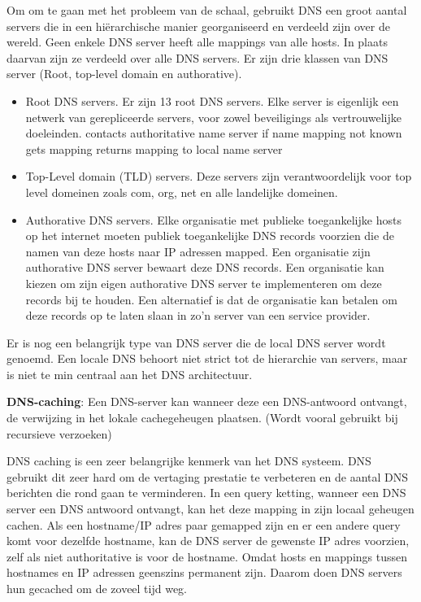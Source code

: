 
Om om te gaan met het probleem van de schaal, gebruikt DNS een groot aantal servers die in een hiërarchische manier georganiseerd en verdeeld zijn over de wereld. Geen enkele DNS server heeft alle mappings van alle hosts. In plaats daarvan zijn ze verdeeld over alle DNS servers. Er zijn drie klassen van DNS server (Root, top-level domain en authorative).

\begin{itemize}
    \item Root DNS servers. Er zijn 13 root DNS servers. Elke server is eigenlijk een netwerk van gerepliceerde servers, voor zowel beveiligings als vertrouwelijke doeleinden.
    \bi
    \itf contacts authoritative name server if name mapping not known
    \itf gets mapping
    \itf returns mapping to local name server
    \ei
\item Top-Level domain (TLD) servers. Deze servers zijn verantwoordelijk voor top level domeinen zoals com, org, net en alle landelijke domeinen.
\item Authorative DNS servers. Elke organisatie met publieke toegankelijke hosts op het internet moeten publiek toegankelijke DNS records voorzien die de namen van deze hosts naar IP adressen mapped. Een organisatie zijn authorative DNS server bewaart deze DNS records. Een organisatie kan kiezen om zijn eigen authorative DNS server te implementeren om deze records bij te houden. Een alternatief is dat de organisatie kan betalen om deze records op te laten slaan in zo’n server van een service provider.
\end{itemize}

\noindent Er is nog een belangrijk type van DNS server die de local DNS server wordt genoemd. Een locale DNS behoort niet strict tot de hierarchie van servers, maar is niet te min centraal aan het DNS architectuur. 


\textbf{DNS-caching}: Een DNS-server kan wanneer deze een DNS-antwoord ontvangt, de verwijzing in het lokale cachegeheugen plaatsen. (Wordt vooral gebruikt bij recursieve verzoeken)

\noindent DNS caching is een zeer belangrijke kenmerk van het DNS systeem. DNS gebruikt dit zeer hard om de vertaging prestatie te verbeteren en de aantal DNS berichten die rond gaan te verminderen. In een query ketting, wanneer een DNS server een DNS antwoord ontvangt, kan het deze mapping in zijn locaal geheugen cachen. Als een hostname/IP adres paar gemapped zijn en er een andere query komt voor dezelfde hostname, kan de DNS server de gewenste IP adres voorzien, zelf als niet authoritative is voor de hostname. Omdat hosts en mappings tussen hostnames en IP adressen geenszins permanent zijn. Daarom doen DNS servers hun gecached om de zoveel tijd weg.

